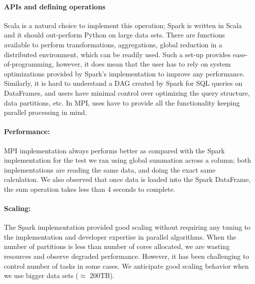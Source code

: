 \documentclass[11pt, twocolumn]{article}
\begin{document}
\paragraph{APIs and defining operations} 
Scala is a natural choice to implement this operation; Spark is written in Scala 
and it should out-perform Python on large data sets.  
 There are functions available to
  perform transformations, aggregations, global reduction in a distributed environment, which can be
  readily used. Such a set-up provides ease-of-programming, however, it does mean that the user has to
  rely on system optimizations provided by Spark's implementation to
  improve any performance. 
Similarly, it is hard to understand a DAG created by Spark for SQL queries on 
DataFrames, and users have minimal control over optimizing the 
query structure, data partitions, etc. In MPI, uses have to provide all the functionality keeping 
parallel processing in mind. 


\paragraph{Performance: } 

MPI implementation always performs better as compared with the Spark 
implementation for the test we ran using global summation across a column; 
both implementations are reading the same data, and doing the exact same calculation. 
We also observed that once data is loaded into the Spark DataFrame, the sum operation takes 
less than 4 seconds to complete. 
 
\paragraph{Scaling: }
The Spark implementation provided good
  scaling without requiring any tuning to the implementation and
  developer expertise in parallel algorithms. 
  When the number of partitions is less than number of cores allocated, 
we are wasting resources and observe degraded performance. 
However, it has been challenging to control number of tasks in some cases. 
We anticipate good scaling behavior when we use bigger data sets ($\approx$ 200TB). 
   
\end{document}
